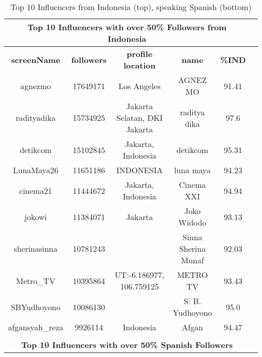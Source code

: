\iffalse
\begin{table} \renewcommand{\arraystretch}{0.99}
\scriptsize
\caption[Top Influencers of Indonesia (top), speaking Spanish (bottom)]{Top 10 Influencers from Indonesia (top), speaking Spanish (bottom)}
\label{table_10_app2}
\begin{center}
\begin{tabular}{|c|c|c|c|c|c|}
\multicolumn{5}{c}{\bfseries Top 10 Influencers with over 50\% Followers from Indonesia}\\
\hline
\bfseries screenName & \bfseries followers & \bfseries profile location & \bfseries name & \bfseries {\%}IND\\
\hline
agnezmo & 17649171 & Los Angeles & AGNEZ MO & 91.41 \\
\hline
radityadika & 15734925 & Jakarta Selatan, DKI Jakarta & raditya dika & 97.6 \\
\hline
detikcom & 15102845 & Jakarta, Indonesia & detikcom & 95.31 \\
\hline
LunaMaya26 & 11651186 & INDONESIA & luna maya & 94.23 \\
\hline
cinema21 & 11444672 & Jakarta, Indonesia & Cinema XXI & 94.94 \\
\hline
jokowi & 11384071 & Jakarta & Joko Widodo & 93.13 \\
\hline
sherinasinna & 10781243 &  & Sinna Sherina Munaf & 92.03 \\
\hline
Metro{\_}TV & 10395864 & UT:-6.186977, 106.759125 & METRO TV & 93.43 \\
\hline
SBYudhoyono & 10086130 &  & S. B. Yudhoyono & 95.0 \\
\hline
afgansyah{\_}reza & 9926114 & Indonesia & Afgan & 94.47 \\

\hline
\multicolumn{5}{c}{}\\
\multicolumn{5}{c}{\bfseries Top 10 Influencers with over 50\% Spanish Followers}\\
\hline


\end{tabular}
\end{center}
\end{table}

